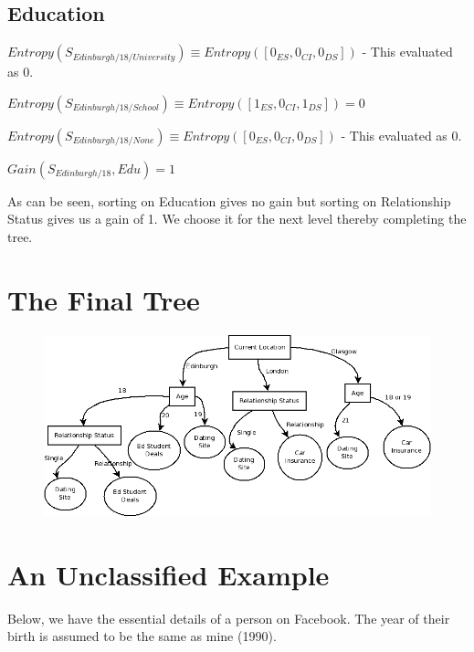 \documentclass[8pt]{article}
\begin{document}
    \subsection{Education}
      \begin{description}
        \setlength{\itemsep}{1pt}
        \setlength{\parskip}{0pt}
        \setlength{\parsep}{0pt}
        \item[]$Entropy(S_{Edinburgh/18/University})\equiv Entropy([0_{ES},0_{CI},0_{DS}]) $ - This evaluated as 0.
        \item[]$Entropy(S_{Edinburgh/18/School})\equiv Entropy([1_{ES},0_{CI},1_{DS}]) = 0$
        \item[]$Entropy(S_{Edinburgh/18/None})\equiv Entropy([0_{ES},0_{CI},0_{DS}]) $ - This evaluated as 0.
        \item[]$Gain(S_{Edinburgh/18},Edu)= 1$
      \end{description}

     As can be seen, sorting on Education gives no gain but sorting on Relationship Status gives us a gain of 1.
     We choose it for the next level thereby completing the tree. 
 
   \section{The Final Tree}

     \begin{figure}[ht!]
       \includegraphics[scale=0.6]{Tree.png} 
     \end{figure}
   
     \newpage
   \section{An Unclassified Example}
     Below, we have the essential details of a person on Facebook. The year of their birth is assumed to be the same as
     mine (1990).
     
\end{document}
